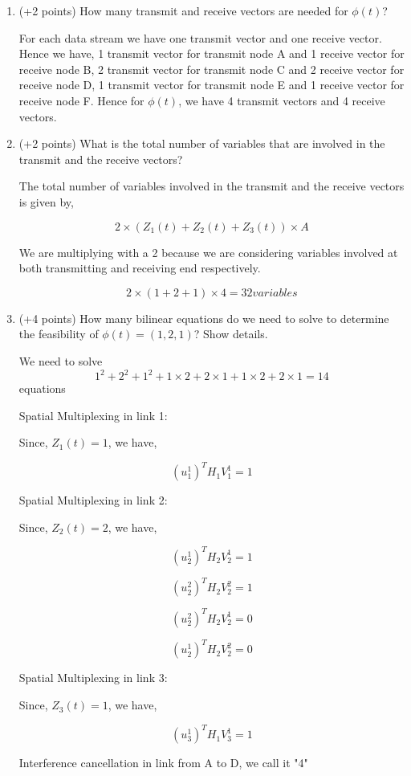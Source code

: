 \documentclass[a4paper,oneside,10pt]{report}
\begin{document}
\begin{enumerate}

\item	(+2 points) How many transmit and receive vectors are needed for $\phi(t)$?

For each data stream we have one transmit vector and one receive vector. Hence we have,
1 transmit vector for transmit node A and 1 receive vector for receive node B,
2 transmit vector for transmit node C and 2 receive vector for receive node D,
1 transmit vector for transmit node E and 1 receive vector for receive node F.
Hence for $\phi(t)$, we have 4 transmit vectors and 4 receive vectors.

\item	(+2 points) What is the total number of variables that are involved in the transmit and the receive vectors?

The total number of variables involved in the transmit and the receive vectors is given by,

$$2 \times (Z_1(t) + Z_2(t) + Z_3(t)) \times A$$

We are multiplying with a 2 because we are considering variables involved at both transmitting and receiving end respectively.

$$2 \times (1 + 2 + 1) \times 4 = 32 variables$$

\item	(+4 points) How many bilinear equations do we need to solve to determine the feasibility of $\phi(t)=(1,2,1)$? Show details.

We need to solve $$1^2 + 2^2 + 1^2 + 1 \times 2 + 2 \times 1 + 1 \times 2 + 2 \times 1 = 14$$ equations

Spatial Multiplexing in link 1:

Since, $Z_1(t) = 1$, we have,

$$(u^1_1)^T H_1 V^1_1 = 1$$

Spatial Multiplexing in link 2:

Since, $Z_2(t) = 2$, we have,

$$(u^1_2)^T H_2 V^1_2 = 1$$

$$(u^2_2)^T H_2 V^2_2 = 1$$

$$(u^2_2)^T H_2 V^1_2 = 0$$

$$(u^1_2)^T H_2 V^2_2 = 0$$

Spatial Multiplexing in link 3:

Since, $Z_3(t) = 1$, we have,

$$(u^1_3)^T H_1 V^1_3 = 1$$

Interference cancellation in link from A to D, we call it "4"


\end{enumerate}
\end{document}
